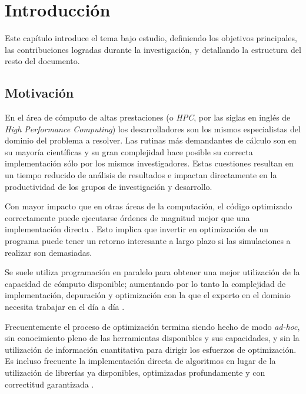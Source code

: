 \documentclass[a4paper]{report}
\begin{document}
\tableofcontents

\listoffigures
\listoftables
\lstlistoflistings

\chapter{Introducción}

Este capítulo introduce el tema bajo estudio, definiendo los objetivos principales, las contribuciones logradas durante la investigación, y detallando la estructura del resto del documento.

\section{Motivación}

En el área de cómputo de altas prestaciones (o {\it HPC}, por las siglas en inglés de {\it High Performance Computing}) los desarrolladores son los mismos especialistas del dominio del
 problema a resolver. Las rutinas más demandantes de cálculo son en su mayoría científicas y su gran complejidad hace posible su correcta implementación sólo por los mismos investigadores.
Estas cuestiones resultan en un tiempo reducido de análisis de resultados e impactan directamente en la productividad de los grupos de investigación y desarrollo.

\bigskip

Con mayor impacto que en otras áreas de la computación, el código optimizado correctamente puede ejecutarse órdenes de magnitud mejor que una implementación directa \cite{mm-tool}. 
Esto implica que invertir en optimización de un programa puede tener un retorno interesante a largo plazo si las simulaciones a realizar son demasiadas.

\bigskip

Se suele utiliza programación en paralelo para obtener una mejor utilización de la capacidad de cómputo disponible; aumentando por lo tanto la complejidad de implementación, depuración y
optimización con la que el experto en el dominio necesita trabajar en el día a día \cite{is-parallel-programming-hard}.

\bigskip

Frecuentemente el proceso de optimización termina siendo hecho de modo {\it ad-hoc}, sin conocimiento pleno de las herramientas disponibles y sus capacidades, y sin la utilización de
información cuantitativa para dirigir los esfuerzos de optimización. Es incluso frecuente la implementación directa de algoritmos en lugar de la utilización de librerías ya disponibles,
optimizadas profundamente y con correctitud garantizada \cite{mklbook}.
\end{document}

